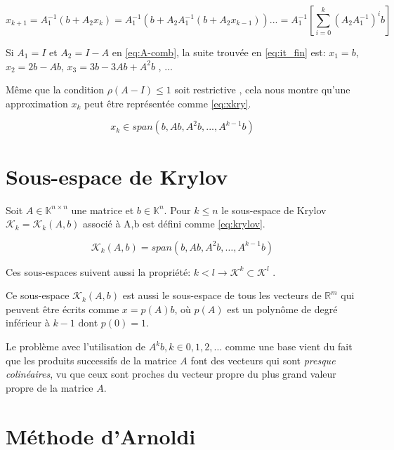     \begin{equation}\label{eq:it_fin}
        x_{k+1} = A_{1}^{-1}(b + A_{2}x_{k}) = A_{1}^{-1}(b + A_{2}A_{1}^{-1}(b + A_{2}x_{k-1}))... = A_{1}^{-1} \left[ \sum_{i=0}^{k} (A_{2}A_{1}^{-1})^{i}b\right]
    \end{equation}

    Si $A_{1} = I$ et $A_{2} = I - A$ en \ref{eq:A-comb}, la suite trouvée en \ref{eq:it_fin} est: $x_{1} = b$,$x_{2} = 2b- Ab$, $x_{3} = 3b-3Ab+A^{2}b$ , ...

    Même que la condition $\rho(A-I) \leq 1$ soit restrictive \cite{bonnet}, cela nous montre qu'une approximation $x_{k}$ peut être représentée comme \ref{eq:xkry}.

    \begin{equation}\label{eq:xkry}
        x_{k} \in span(b,Ab,A^{2}b,...,A^{k-1}b)
    \end{equation}

    \section{Sous-espace de Krylov}
    Soit $A \in \mathbb{K}^{n \times n}$ une matrice et $b\in \mathbb{K}^{n}$. Pour $k\leq n$ le sous-espace de Krylov $\mathcal{K}_{k}=\mathcal{K}_{k}(A,b)$ associé à A,b est défini comme \ref{eq:krylov}.

    \begin{equation}\label{eq:krylov}
        \mathcal{K}_{k}(A,b) = span(b,Ab,A^{2}b,\dots , A^{k-1}b)
    \end{equation}

    Ces sous-espaces suivent aussi la propriété: $k<l \to \mathcal{K}^{k} \subset \mathcal{K}^{l}$ \cite{bonnet}.

    Ce sous-espace $\mathcal{K}_{k}(A,b)$ est aussi le sous-espace de tous les vecteurs de $\mathbb{R}^{m}$ qui peuvent être écrits comme $x=p(A)b$, où $p(A)$ est un polynôme de degré inférieur à $k-1$ dont $p(0)=1$.

    Le problème avec l'utilisation de ${A^{k}b}, k \in {0,1,2,\dots}$ comme une base vient du fait que les produits successifs de la matrice $A$ font des vecteurs qui sont \textit{presque colinéaires}, vu que ceux sont proches du vecteur propre du plus grand valeur propre de la matrice $A$.

    \section{Méthode d'Arnoldi}
    
